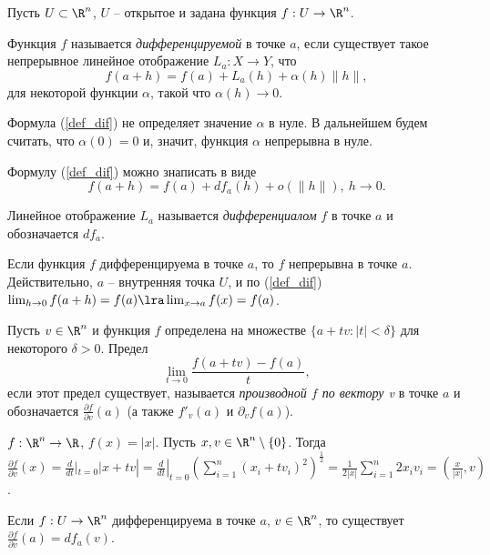 Пусть $U \subset \R^{n}$, $U$ -- открытое и задана функция $f: U \to \R^{n}$.

\begin{definition}
    Функция $f$ называется \textit{дифференцируемой} в точке $a$, если существует такое непрерывное линейное отображение $L_{a}: X \to Y$, что 
    \[f(a + h) = f(a) + L_{a}(h) + \alpha(h)\|h\|, \label{def_dif}\]
    для некоторой функции $\alpha$, такой что $\alpha(h) \to 0$.
\end{definition}

\begin{note}
    Формула (\ref{def_dif}) не определяет значение $\alpha$ в нуле. В дальнейшем будем считать, что $\alpha(0) = 0$ и, значит, функция $\alpha$ непрерывна в нуле.

    Формулу (\ref{def_dif}) можно знаписать в виде
    \[f(a + h) = f(a) + df_{a}(h) + o(\|h\|), \ h \to 0.\]

    Линейное отображение $L_{a}$ называется \textit{дифференциалом} $f$ в точке $a$ и обозначается $df_{a}$.
\end{note}

\begin{note}
    Если функция $f$ дифференцируема в точке $a$, то $f$ непрерывна в точке $a$. Действительно, $a$ -- внутренняя точка $U$, и по (\ref{def_dif}) $\lim_{h \to 0} f(a + h) = f(a) \lra \lim_{x \to a}f(x) = f(a)$.
\end{note}

\begin{definition}
    Пусть $v \in \R^{n}$ и функция $f$ определена на множестве $\{a + tv: |t| < \delta\}$ для некоторого $\delta > 0$. Предел 
    \[\lim_{t \to 0} \frac{f(a + tv) - f(a)}{t},\]
    если этот предел существует, называется \textit{производной $f$ по вектору v} в точке $a$ и обозначается $\frac{\partial f}{\partial v}(a)$ (а также $f'_{v}(a)$ и $\partial_{v}f(a)$).
\end{definition}

\begin{example}
    $f: \R^{n} \to \R$, $f(x) = |x|$. Пусть $x, v \in \R^{n} \setminus \{0\}$. Тогда $\frac{\partial f}{\partial v}(x) = \frac{d}{dt}|_{t = 0}|x + tv| = \frac{d}{dt}|_{t = 0}\left(\sum_{i = 1}^{n}(x_{i} + tv_{i})^{2}\right)^\frac{1}{2} = \frac{1}{2|x|}\sum_{i = 1}^{n}2x_{i}v_{i} = \left(\frac{x}{|x|}, v\right)$.
\end{example}

\begin{theorem}
    Если $f: U \to \R^{n}$ дифференцируема в точке $a$, $v \in \R^{n}$, то существует $\frac{\partial f}{\partial v}(a) = df_{a}(v)$.
\end{theorem}

